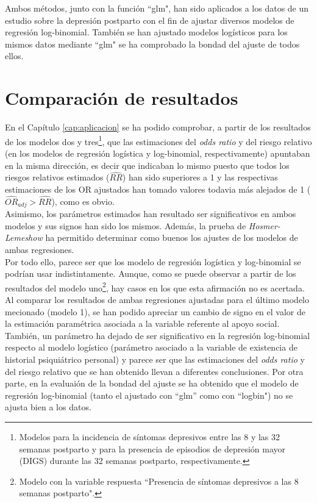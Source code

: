 Ambos métodos, junto con la función ``glm", han sido aplicados a los datos de un estudio sobre la depresión postparto con el fin de ajustar diversos modelos de regresión log-binomial. También se han ajustado modelos logísticos para los mismos datos mediante ``glm"  se ha comprobado la bondad del ajuste de todos ellos.

\section{Comparación de resultados}

En el Capítulo \ref{cap:aplicacion} se ha podido comprobar, a partir de los resultados de los modelos dos y tres\footnote{Modelos para la incidencia de síntomas depresivos entre las 8 y las 32 semanas postparto y para la presencia de episodios de depresión mayor (DIGS) durante las 32 semanas postparto, respectivamente.}, que las estimaciones del \textit{odds ratio} y del riesgo relativo (en los modelos de regresión logística y log-binomial, respectivamente)  apuntaban en la misma dirección, es decir que indicaban lo mismo puesto que todos los riesgos relativos estimados ($\widehat{RR}$) han sido superiores a 1 y las respectivas estimaciones de los OR ajustados han tomado valores todavia más alejados de 1 ($\widehat{OR}_{adj} > \widehat{RR}$), como es obvio. \\

Asimismo, los parámetros estimados han resultado ser significativos en ambos modelos y sus signos han sido los mismos. Además, la prueba de \textit{Hosmer-Lemeshow} ha permitido determinar como buenos los ajustes de los modelos de ambas regresiones. \\

Por todo ello, parece ser que los modelo de regresión logística y log-binomial se podrían usar indistintamente. Aunque, como se puede observar a partir de los resultados del modelo uno\footnote{Modelo con la variable respuesta ``Presencia de síntomas depresivos a las 8 semanas postparto".}, hay casos en los que esta afirmación no es acertada.\\

Al comparar los resultados de ambas regresiones ajustadas para el último modelo mecionado (modelo 1), se han podido apreciar un cambio de signo en el valor de la estimación paramétrica asociada a la variable referente al apoyo social. También, un parámetro ha dejado de ser significativo en la regresión log-binomial respecto al modelo logístico (parámetro asociado a la variable de existencia de historial psiquiátrico personal) y parece ser que las estimaciones del \textit{odds ratio} y del riesgo relativo que se han obtenido llevan a diferentes conclusiones.  Por otra parte, en la evaluaión de la bondad del ajuste se ha obtenido que el modelo de regresión log-binomial (tanto el ajustado con ``glm'' como con ``logbin") no se ajusta bien a los datos.\\

